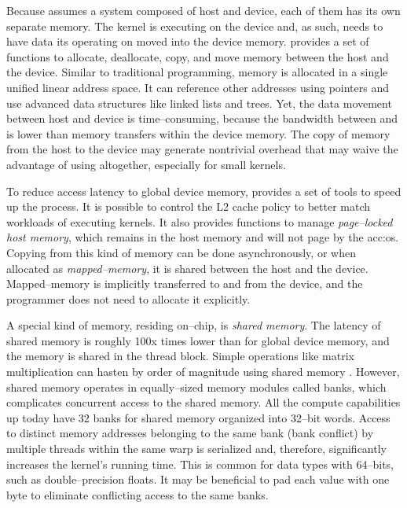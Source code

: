 Because \cuda assumes a system composed of host and device, each of them has its own separate memory. The kernel is executing on the device and, as such, needs to have data its operating on moved into the device memory. \cuda provides a set of functions to allocate, deallocate, copy, and move memory between the host and the device. Similar to traditional \cpp programming, \cuda memory is allocated in a single unified linear address space. It can reference other addresses using pointers and use advanced data structures like linked lists and trees. Yet, the data movement between host and device is time--consuming, because the bandwidth between \cpu and \gpu is lower than memory transfers within the device memory. The copy of memory from the host to the device may generate nontrivial overhead that may waive the advantage of using \gpu altogether, especially for small kernels. 

To reduce access latency to global device memory, \cuda provides a set of tools to speed up the process. It is possible to control the L2 cache policy to better match workloads of executing kernels. It also provides functions to manage \emph{page--locked host memory}, which remains in the host memory and will not page by the \acrshort{acc:os}. Copying from this kind of memory can be done asynchronously, or when allocated as \emph{mapped--memory}, it is shared between the host and the device. Mapped--memory is implicitly transferred to and from the device, and the programmer does not need to allocate it explicitly.

A special kind of memory, residing on--chip, is \emph{shared memory}. The latency of shared memory is roughly 100x times lower than for global device memory, and the memory is shared in the thread block. Simple operations like matrix multiplication can hasten by order of magnitude using shared memory \citep{MatrixMultiplicationGPU}. However, shared memory operates in equally--sized memory modules called banks, which complicates concurrent access to the shared memory. All the compute capabilities up today have 32 banks for shared memory organized into 32--bit words. Access to distinct memory addresses belonging to the same bank (bank conflict) by multiple threads within the same warp is serialized and, therefore, significantly increases the kernel's running time. This is common for data types with 64--bits, such as double--precision floats. It may be beneficial to pad each value with one byte to eliminate conflicting access to the same banks.

